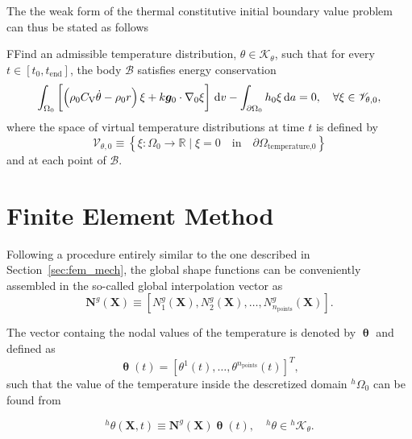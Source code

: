 The the weak form of the thermal constitutive initial boundary value problem can thus be stated as follows
 \begin{problem}
     FFind an admissible temperature distribution, $\theta \in \mathscr{K}_\theta$, such that for every $t\in [t_0,t_\text{end}]$, the body $\mathscr{B}$ satisfies energy conservation
         \begin{equation}
         \int_{\Omega_0}   \left[\left(\rho_0 C_\mathrm{V} \dot \theta - \rho_0 r\right) \xi +k\bm g_0\cdot \nabla_0 \xi\right]\,\mathrm{d} v - \int_{\partial\Omega_0} h_0 \xi\,\mathrm{d} a = 0,\quad \forall \xi \in \mathscr{V}_{\theta,0},
     \end{equation}
     where the space of virtual temperature distributions at time $t$ is defined by
     \begin{equation}
         \mathscr{V}_{\theta,0} \equiv \left\{\xi:\Omega_0\to \mathbb R\;|\;\xi = 0\quad \text{in}\quad \partial\Omega_\text{temperature,0}\right\}
     \end{equation}
     and at each point of $\mathscr{B}$.
 \end{problem}

\section{Finite Element Method} \label{sec:fem_therm}

Following a procedure entirely similar to the one described in Section~\ref{sec:fem_mech}, the global shape functions can be conveniently assembled in the so-called global interpolation vector as
\begin{equation}
\mathbf{N}^{g}(\boldsymbol{X}) \equiv\left[N_1^g(\bm X), N_2^g(\bm X), \dots, N^g_{n_\text{points}}(\bm X)\right].
\end{equation}

The vector containg the nodal values of the temperature is denoted by \(\bm \uptheta\) and defined as
\begin{equation}
 \bm \uptheta (t)= \left[\theta^{1}(t), \dots, \theta^{n_{\text {points}}}(t)\right]^{T},
\end{equation}
such that the value of the temperature inside the descretized domain \(^h\Omega_0\) can be found from
\begin{highlight}
\begin{equation}
{ }^{h} \theta(\bm{X},t) \equiv \mathbf{N}^{g}(\bm{X}) \bm{\uptheta}(t), \quad{ }^{h} \theta \in{ }^{h} \mathscr{K}_\theta.
\end{equation}
\end{highlight}

